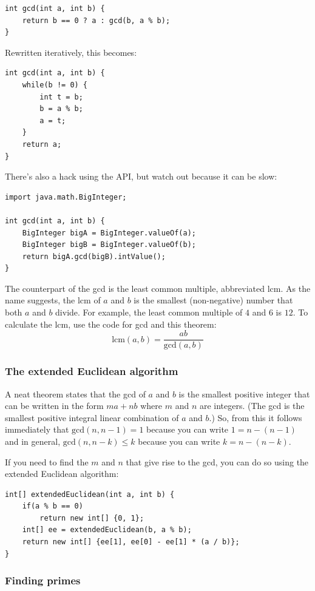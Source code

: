 \documentclass[a4paper,12pt]{article}
\begin{document}
\begin{lstlisting}
int gcd(int a, int b) {
	return b == 0 ? a : gcd(b, a % b);
}
\end{lstlisting}

\noindent Rewritten iteratively, this becomes:

\begin{lstlisting}
int gcd(int a, int b) {
	while(b != 0) {
		int t = b;
		b = a % b;
		a = t;
	}
	return a;
}
\end{lstlisting}

\noindent There's also a hack using the API, but watch out because it can be slow:

\begin{lstlisting}
import java.math.BigInteger;

int gcd(int a, int b) {
	BigInteger bigA = BigInteger.valueOf(a);
	BigInteger bigB = BigInteger.valueOf(b);
	return bigA.gcd(bigB).intValue();
}
\end{lstlisting}

The counterpart of the gcd is the least common multiple, abbreviated lcm. As the name suggests, the lcm of $a$ and $b$ is the smallest (non-negative) number that both $a$ and $b$ divide. For example, the least common multiple of $4$ and $6$ is $12$. To calculate the lcm, use the code for gcd and this theorem:
\[\mathrm{lcm}(a,b) = \frac{ab}{\mathrm{gcd}(a,b)}\]

\subsubsection{The extended Euclidean algorithm}
A neat theorem states that the gcd of $a$ and $b$ is the smallest positive integer that can be written in the form $ma+nb$ where $m$ and $n$ are integers. (The gcd is the smallest positive integral linear combination of $a$ and $b$.) So, from this it follows immediately that $\mathrm{gcd}(n,n-1)=1$ because you can write $1=n-(n-1)$ and in general, $\mathrm{gcd}(n,n-k)\le k$ because you can write $k=n-(n-k)$.

If you need to find the $m$ and $n$ that give rise to the gcd, you can do so using the extended Euclidean algorithm:
\begin{lstlisting}
int[] extendedEuclidean(int a, int b) {
	if(a % b == 0)
		return new int[] {0, 1};
	int[] ee = extendedEuclidean(b, a % b);
	return new int[] {ee[1], ee[0] - ee[1] * (a / b)};
}
\end{lstlisting}

\subsubsection{Finding primes}
\end{document}
